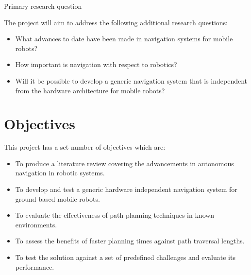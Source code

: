 \noindent
Primary research question

\noindent
The project will aim to address the following additional research questions:

\begin{itemize}
\item What advances to date have been made in navigation systems for mobile robots?

\item How important is navigation with respect to robotics?

\item Will it be possible to develop a generic navigation system that is independent from the hardware architecture for mobile robots?

\end{itemize}


\section{Objectives}

\noindent
This project has a set number of objectives which are:

\begin{itemize}
\item To produce a literature review covering the advancements in autonomous navigation in robotic systems.

\item To develop and test a generic hardware independent navigation system for ground based mobile robots. 

\item To evaluate the effectiveness of path planning techniques in known environments. 

\item To assess the benefits of faster planning times against path traversal lengths.

\item To test the solution against a set of predefined challenges and evaluate its performance.

\end{itemize}

\newpage


